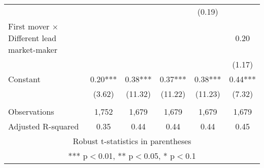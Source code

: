 \documentclass[]{article}
\begin{document}
\begin{tabular}{lccccc}
 &  &  &  & (0.19) &  \\
First mover $\times$ Different lead market-maker &  &  &  &  & 0.20 \\
 &  &  &  &  & (1.17) \\
Constant & 0.20*** & 0.38*** & 0.37*** & 0.38*** & 0.44*** \\
 & (3.62) & (11.32) & (11.22) & (11.23) & (7.32) \\
 &  &  &  &  &  \\
Observations & 1,752 & 1,679 & 1,679 & 1,679 & 1,679 \\
 Adjusted R-squared & 0.35 & 0.44 & 0.44 & 0.44 & 0.45 \\ \hline
\multicolumn{6}{c}{ Robust t-statistics in parentheses} \\
\multicolumn{6}{c}{ *** p$<$0.01, ** p$<$0.05, * p$<$0.1} \\
\end{tabular}
\end{document}
